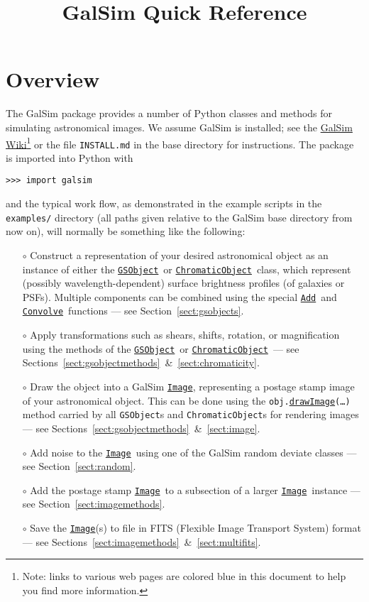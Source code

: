 \documentclass[preprint,10pt]{../../devel/modules/aastex}
\newcommand\GSObject{\href{http://galsim-developers.github.io/GalSim/classgalsim_1_1base_1_1_g_s_object.html}{\texttt{GSObject}}}
\newcommand\ChromaticObject{\href{http://galsim-developers.github.io/GalSim/classgalsim_1_1chromatic_1_1_chromatic_object.html}{\texttt{ChromaticObject}}}
\newcommand\drawImage{\href{http://galsim-developers.github.io/GalSim/classgalsim_1_1base_1_1_g_s_object.html\#aafe6ca9d84fe81543fbc105b897273db}{\texttt{drawImage}}}
\newcommand\Image{\href{http://galsim-developers.github.io/GalSim/classgalsim_1_1image_1_1_image.html}{\texttt{Image}}}
\newcommand\Add{\href{http://galsim-developers.github.io/GalSim/namespacegalsim_1_1compound.html\#ad3f305087db1b740376666d9c022d94e}{\texttt{Add}}}
\newcommand\Convolve{\href{http://galsim-developers.github.io/GalSim/namespacegalsim_1_1compound.html\#a17ccb8acb75a4eb6e35e791e4177957b}{\texttt{Convolve}}}
\begin{document}
\setlength{\parskip}{2.0ex plus 0.5ex minus 0.5ex}
\setlength{\parindent}{0cm}

\title{GalSim Quick Reference}

\tableofcontents

\newpage

\section{Overview}


The GalSim package provides a number of Python classes and methods for
simulating astronomical images.  We assume GalSim is installed; see the
\href{https://github.com/GalSim-developers/GalSim/wiki}{GalSim Wiki}\footnote{
Note: links to various web pages are colored blue in this document to help you find more
information.}
or the file \texttt{INSTALL.md} in the base directory
for instructions.  The package is imported into Python with

\texttt{>>> import galsim}

and the typical work flow, as demonstrated in the example scripts in the {\tt
examples/} directory (all paths given relative to
the GalSim base directory from now on), will normally
be something like the following:

\begin{itemize}

\item[$\circ$]
  Construct a representation of your desired astronomical object
  as an instance of either the \GSObject\ or \ChromaticObject\ class, which represent (possibly
  wavelength-dependent) surface brightness profiles (of galaxies or PSFs).  Multiple components
  can be
  combined using the special \Add\ and \Convolve\ functions --- see Section~\ref{sect:gsobjects}.
\item[$\circ$]
  Apply transformations such as shears, shifts, rotation, or magnification
  using the methods of the \GSObject\ or \ChromaticObject\ --- see
  Sections~\ref{sect:gsobjectmethods}~\&~\ref{sect:chromaticity}.
\item[$\circ$]
  Draw the object into a GalSim \Image, representing a postage
  stamp image of your astronomical object.  This can be done using the
  \texttt{obj.}\drawImage\texttt{(\dots)}
  method carried by all \texttt{GSObject}s and
  \texttt{ChromaticObject}s for rendering images --- see
  Sections~\ref{sect:gsobjectmethods}~\&~\ref{sect:image}.
\item[$\circ$]
  Add noise to the \Image\ using one of the GalSim
  random deviate classes --- see Section~\ref{sect:random}.
\item[$\circ$]
  Add the postage stamp \Image\ to a subsection of a larger
  \Image\ instance --- see Section~\ref{sect:imagemethods}.
\item[$\circ$]
  Save the \Image(s) to file in FITS (Flexible Image Transport
  System) format --- see Sections~\ref{sect:imagemethods}~\&~\ref{sect:multifits}.
\end{itemize}
\end{document}
